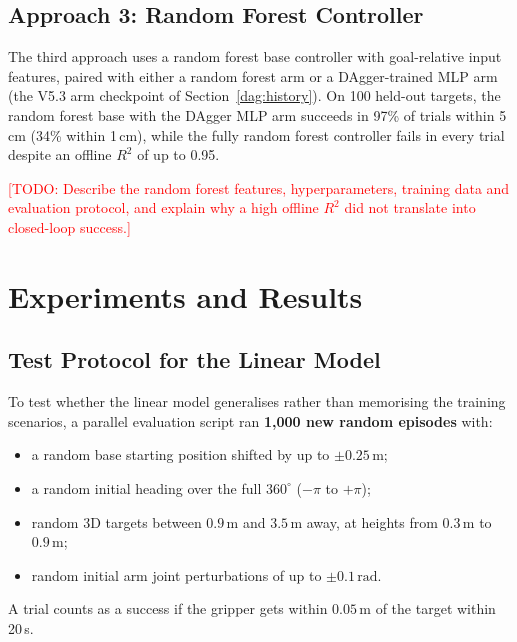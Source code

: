 \documentclass[conference]{IEEEtran}
\newcommand{\todo}[1]{\textcolor{red}{[TODO: #1]}}
\begin{document}
\subsection{Approach 3: Random Forest Controller}
\label{sec:rf}

The third approach uses a random forest base controller with goal-relative input features, paired with either a random forest arm or a DAgger-trained MLP arm (the V5.3 arm checkpoint of Section~\ref{dag:history}). On 100 held-out targets, the random forest base with the DAgger MLP arm succeeds in 97\% of trials within 5\,cm (34\% within 1\,cm), while the fully random forest controller fails in every trial despite an offline $R^2$ of up to 0.95.

\todo{Describe the random forest features, hyperparameters, training data and evaluation protocol, and explain why a high offline $R^2$ did not translate into closed-loop success.}

\section{Experiments and Results}
\label{sec:results}

\subsection{Test Protocol for the Linear Model}
To test whether the linear model generalises rather than memorising the training scenarios, a parallel evaluation script ran \textbf{1,000 new random episodes} with:
\begin{itemize}
    \item a random base starting position shifted by up to $\pm 0.25\,\text{m}$;
    \item a random initial heading over the full $360^\circ$ ($-\pi$ to $+\pi$);
    \item random 3D targets between $0.9\,\text{m}$ and $3.5\,\text{m}$ away, at heights from $0.3\,\text{m}$ to $0.9\,\text{m}$;
    \item random initial arm joint perturbations of up to $\pm 0.1\,\text{rad}$.
\end{itemize}
A trial counts as a success if the gripper gets within $0.05\,\text{m}$ of the target within 20\,s.
\end{document}
